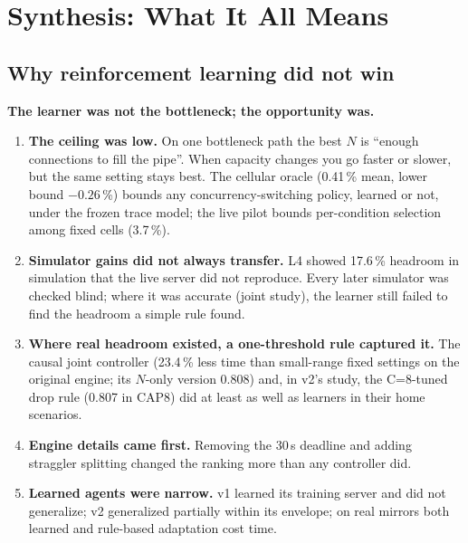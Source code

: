 \chapter{Synthesis: What It All Means}\label{ch:synthesis}

\section{Why reinforcement learning did not win}
\begin{keyidea}
\textbf{The learner was not the bottleneck; the opportunity was.}
\end{keyidea}
\begin{enumerate}
\item \textbf{The ceiling was low.} On one bottleneck path the best $N$ is ``enough connections to fill the pipe''. When capacity changes you go faster or slower, but the same setting stays best. The cellular oracle (0.41\,\% mean, lower bound $-0.26$\,\%) bounds any concurrency-switching policy, learned or not, under the frozen trace model; the live pilot bounds per-condition selection among fixed cells (3.7\,\%).
\item \textbf{Simulator gains did not always transfer.} L4 showed 17.6\,\% headroom in simulation that the live server did not reproduce. Every later simulator was checked blind; where it was accurate (joint study), the learner still failed to find the headroom a simple rule found.
\item \textbf{Where real headroom existed, a one-threshold rule captured it.} The causal joint controller (23.4\,\% less time than small-range fixed settings on the original engine; its $N$-only version 0.808) and, in v2's study, the C=8-tuned drop rule (0.807 in CAP8) did at least as well as learners in their home scenarios.
\item \textbf{Engine details came first.} Removing the 30\,s deadline and adding straggler splitting changed the ranking more than any controller did.
\item \textbf{Learned agents were narrow.} v1 learned its training server and did not generalize; v2 generalized partially within its envelope; on real mirrors both learned and rule-based adaptation cost time.
\end{enumerate}

